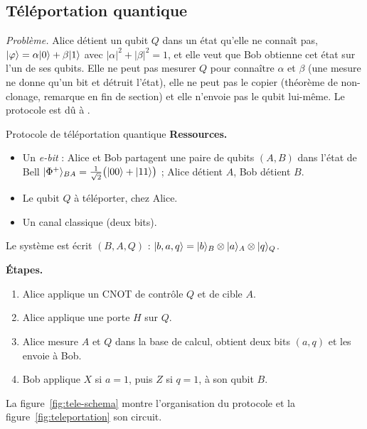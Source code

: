 \subsection{Téléportation quantique}\label{sec:teleportation}

\emph{Problème.} Alice détient un qubit $Q$ dans un état qu'elle ne connaît pas,
$|\varphi\rangle=\alpha|0\rangle+\beta|1\rangle$ avec $|\alpha|^2+|\beta|^2=1$, et elle veut que Bob
obtienne cet état sur l'un de ses qubits. Elle ne peut pas mesurer $Q$ pour connaître
$\alpha$ et $\beta$ (une mesure ne donne qu'un bit et détruit l'état), elle ne peut pas le
copier (théorème de non-clonage, remarque en fin de section) et elle n'envoie pas le qubit
lui-même. Le protocole est dû à \textcite{bennett1993}.

\begin{definition}{Protocole de téléportation quantique}
\textbf{Ressources.}
\begin{itemize}[nosep]
  \item Un \emph{e-bit} : Alice et Bob partagent une paire de qubits $(A,B)$ dans l'état de Bell
        $|\Phi^+\rangle_{BA}=\frac{1}{\sqrt2}\big(|00\rangle+|11\rangle\big)$ ; Alice détient $A$,
        Bob détient $B$.
  \item Le qubit $Q$ à téléporter, chez Alice.
  \item Un canal classique (deux bits).
\end{itemize}
Le système est écrit $(B,A,Q)$ : $|b,a,q\rangle=|b\rangle_B\otimes|a\rangle_A\otimes|q\rangle_Q$.

\textbf{Étapes.}
\begin{enumerate}[nosep]
  \item Alice applique un CNOT de contrôle $Q$ et de cible $A$.
  \item Alice applique une porte $H$ sur $Q$.
  \item Alice mesure $A$ et $Q$ dans la base de calcul, obtient deux bits $(a,q)$ et les envoie
        à Bob.
  \item Bob applique $X$ si $a=1$, puis $Z$ si $q=1$, à son qubit $B$.
\end{enumerate}
\end{definition}

La figure~\ref{fig:tele-schema} montre l'organisation du protocole et la
figure~\ref{fig:teleportation} son circuit.

